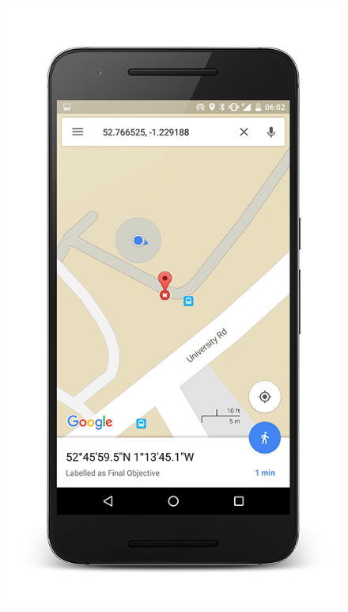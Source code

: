 \documentclass[10pt, a4paper]{article}
\begin{document}
\begin{figure}[!htb]
  \includegraphics[width=1.0\textwidth]{phone_map_view_1}
  \caption{}
\endminipage
\end{figure}
\end{document}
